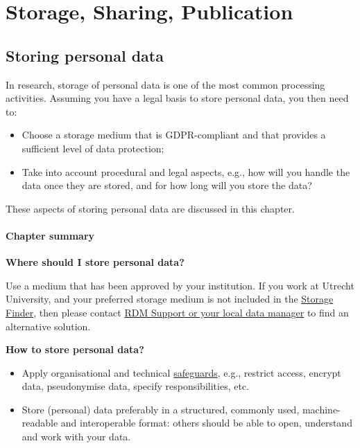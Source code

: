 \documentclass[
]{book}
\providecommand{\tightlist}{%
  \setlength{\itemsep}{0pt}\setlength{\parskip}{0pt}}
\begin{document}
\hypertarget{part-storage-sharing-publication}{%
\part*{Storage, Sharing, Publication}\label{part-storage-sharing-publication}}

\hypertarget{data-storage}{%
\chapter{Storing personal data}\label{data-storage}}

In research, storage of personal data is one of the most common processing
activities. Assuming you have a legal basis to store personal data, you
then need to:

\begin{itemize}
\tightlist
\item
  Choose a storage medium that is GDPR-compliant and that provides a sufficient
  level of data protection;
\item
  Take into account procedural and legal aspects, e.g., how will you handle the
  data once they are stored, and for how long will you store the data?
\end{itemize}

These aspects of storing personal data are discussed in this chapter.

\hypertarget{chapter-summary-1}{%
\subsection{Chapter summary}\label{chapter-summary-1}}

\textbf{Where should I store personal data?}

Use a medium that has been approved by your institution. If you work at Utrecht
University, and your preferred storage medium is not included in the
\href{https://tools.uu.nl/storagefinder/}{Storage Finder},
then please contact \protect\hyperlink{support}{RDM Support or your local data manager} to find
an alternative solution.

\textbf{How to store personal data?}

\begin{itemize}
\tightlist
\item
  Apply organisational and technical \protect\hyperlink{privacy-by-design}{safeguards},
  e.g., restrict access, encrypt data, pseudonymise data, specify responsibilities, etc.
\item
  Store (personal) data preferably in a structured, commonly used, machine-readable
  and interoperable format: others should be able to open, understand and work
  with your data.
\end{itemize}
\end{document}
